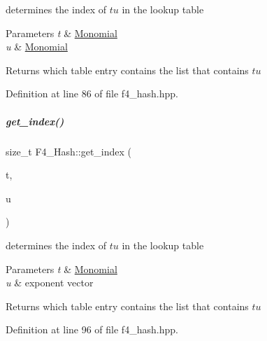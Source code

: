 determines the index of $tu$ in the lookup table 


\begin{DoxyParams}{Parameters}
{\em t} & {\ttfamily \hyperlink{group__polygroup_class_monomial}{Monomial}} \\
\hline
{\em u} & {\ttfamily \hyperlink{group__polygroup_class_monomial}{Monomial}} \\
\hline
\end{DoxyParams}
\begin{DoxyReturn}{Returns}
which table entry contains the list that contains $tu$ 
\end{DoxyReturn}


Definition at line 86 of file f4\+\_\+hash.\+hpp.

\mbox{\label{group___g_b_computation_aa7035dafc727cfb078fea49e8bbd011c}} 
\subparagraph{\texorpdfstring{get\+\_\+index()}{get\_index()}\hspace{0.1cm}{\footnotesize\ttfamily [3/3]}}
{\footnotesize\ttfamily size\+\_\+t F4\+\_\+\+Hash\+::get\+\_\+index (\begin{DoxyParamCaption}\item[{const \hyperlink{group__polygroup_class_monomial}{Monomial} \&}]{t,  }\item[{const E\+X\+P\+\_\+\+T\+Y\+PE $\ast$}]{u }\end{DoxyParamCaption})\hspace{0.3cm}{\ttfamily [inline]}}



determines the index of $tu$ in the lookup table 


\begin{DoxyParams}{Parameters}
{\em t} & {\ttfamily \hyperlink{group__polygroup_class_monomial}{Monomial}} \\
\hline
{\em u} & {\ttfamily exponent} vector \\
\hline
\end{DoxyParams}
\begin{DoxyReturn}{Returns}
which table entry contains the list that contains $tu$ 
\end{DoxyReturn}


Definition at line 96 of file f4\+\_\+hash.\+hpp.

